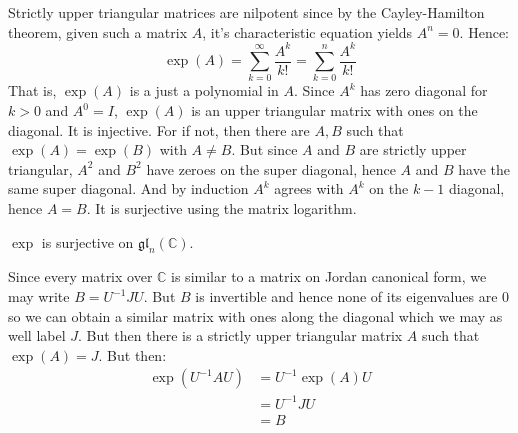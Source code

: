 \documentclass{book}                                                           %
\begin{document}
                \begin{solution}
                    Strictly upper triangular matrices are nilpotent since by the
                    Cayley-Hamilton theorem, given such a matrix $A$, it's characteristic
                    equation yields $A^{n}=0$. Hence:
                    \begin{equation}
                        \exp(A)=\sum_{k=0}^{\infty}\frac{A^{k}}{k!}
                            =\sum_{k=0}^{n}\frac{A^{k}}{k!}
                    \end{equation}
                    That is, $\exp(A)$ is a just a polynomial in $A$. Since $A^{k}$ has
                    zero diagonal for $k>0$ and $A^{0}=I$, $\exp(A)$ is an upper triangular
                    matrix with ones on the diagonal. It is injective. For if not, then
                    there are $A,B$ such that $\exp(A)=\exp(B)$ with $A\ne{B}$. But since
                    $A$ and $B$ are strictly upper triangular, $A^{2}$ and $B^{2}$ have
                    zeroes on the super diagonal, hence $A$ and $B$ have the same super
                    diagonal. And by induction $A^{k}$ agrees with $A^{k}$ on the
                    $k-1$ diagonal, hence $A=B$. It is surjective using the matrix
                    logarithm.
                \end{solution}
                \begin{problem}
                    $\exp$ is surjective on $\mathfrak{gl}_{n}(\mathbb{C})$.
                \end{problem}
                \begin{solution}
                    Since every matrix over $\mathbb{C}$ is similar to a matrix on Jordan
                    canonical form, we may write $B=U^{\minus{1}}JU$. But $B$ is invertible
                    and hence none of its eigenvalues are 0 so we can obtain a similar
                    matrix with ones along the diagonal which we may as well label $J$. But
                    then there is a strictly upper triangular matrix $A$ such that
                    $\exp(A)=J$. But then:
                    \begin{subequations}
                        \begin{align}
                            \exp(U^{\minus{1}}AU)&=U^{\minus{1}}\exp(A)U\\
                            &=U^{\minus{1}}JU\\
                            &=B
                        \end{align}
                    \end{subequations}
                \end{solution}
\end{document}
